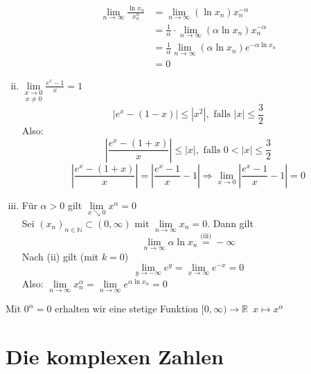 \begin{enumerate}[(i)]
	\begin{align*}
		\lim\limits_{n \to \infty} \frac{\ln x_n}{x_n^\alpha} &= \lim\limits_{n \to \infty} (\ln x_n) x_n^{- \alpha} \\
		&= \frac{1}{\alpha} \cdot \lim\limits_{n \to \infty} (\alpha \ln x_n) x_n^{- \alpha} \\
		&= \frac{1}{\alpha} \lim\limits_{n \to \infty} (\alpha \ln x_n) e^{- \alpha \ln x_n} \\
		&= 0 \tag{nach (ii) mit $k=1$} 
	\end{align*}
	\item $ \underset{x \not= 0}{\lim\limits_{x \to 0}} \frac{e^x -1}{x} =1 $ \\
	\[
		|e^x - (1-x)| \le |x^2| , \text{ falls }|x|\le \frac{3}{2} \tag{Restgliedabschätzung $N=1$}
	\]
	Also:
	\[
		\left|\frac{e^x - (1+x)}{x} \right| \le |x| , \text{ falls } 0 < |x| \le \frac{3}{2}
	\]
	\[
		\left| \frac{e^x -(1+x)}{x}  \right|
		= \left| \frac{e^x -1}{x} -1 \right| 
		\Longrightarrow  \lim\limits_{x \to 0} \left|\frac{e^x-1}{x} -1 \right|= 0
	\]
	\item Für $\alpha >0$ gilt $\lim\limits_{x \searrow 0} x^\alpha  =0$
	\vspace{10pt} \\
	Sei $(x_n)_{n \in \mathds{N}} \subset (0, \infty)$ mit $\lim\limits_{n \to \infty} x_n =0$. Dann gilt
	\[
		\lim\limits_{n \to \infty} \alpha \ln x_n \overset{\text{(iii)}}{=} - \infty
	\] 
	Nach (ii) gilt (mit $k=0$)
	\[
		\lim\limits_{y \to - \infty} e^y = \lim\limits_{x \to \infty}  e^{-x} =0
	\]
	Also: $\lim\limits_{n \to \infty}  x_n^\alpha = \lim\limits_{n \to \infty}  e^{\alpha \ln x_n} = 0$
	
\end{enumerate}
Mit $0^\alpha = 0$ erhalten wir eine stetige Funktion $[0, \infty) \to \mathds{R} \enspace x \mapsto x^\alpha$
\newpage
\section{Die komplexen Zahlen} %
\label{sec:die_komplexen_zahlen}


